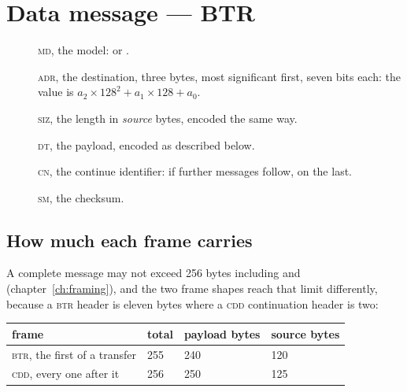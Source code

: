 \section{Data message --- BTR}
\begin{center}
\quad
{}\quad
{}\quad
{}\quad
{}\quad
{}\quad
{}
\end{center}

\begin{description}
\item[] \textsc{md}, the model:  or .
\item[] \textsc{adr}, the destination, three bytes, most
  significant first, seven bits each: the value is $a_2 \times 128^2 + a_1 \times 128 + a_0$.
\item[] \textsc{siz}, the length in \emph{source} bytes, encoded
  the same way.
\item[] \textsc{dt}, the payload, encoded as described below.
\item[] \textsc{cn}, the continue identifier:  if further
  messages follow,  on the last.
\item[] \textsc{sm}, the checksum.
\end{description}

\subsection*{How much each frame carries}
A complete message may not exceed 256 bytes including  and 
(chapter~\ref{ch:framing}), and the two frame shapes reach that limit differently, because
a \textsc{btr} header is eleven bytes where a \textsc{cdd} continuation header is two:

\begin{center}
\begin{tabular}{llll}
\toprule
frame & total & payload bytes & source bytes \\
\midrule
\textsc{btr}, the first of a transfer & 255 & 240 & 120 \\
\textsc{cdd}, every one after it      & 256 & 250 & 125 \\
\bottomrule
\end{tabular}
\end{center}

